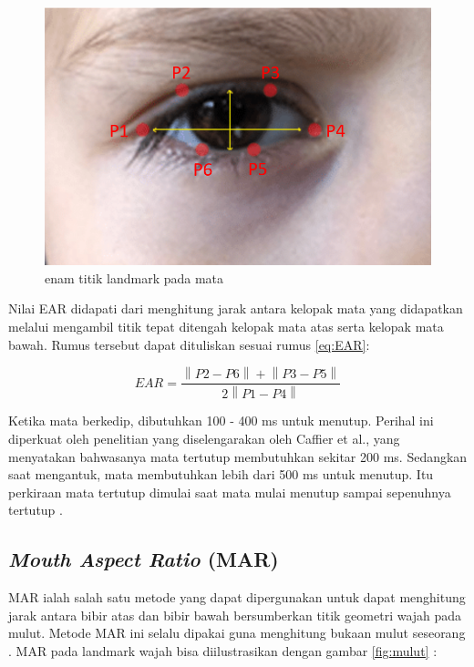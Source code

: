 \begin{figure} [ht] \centering
  \includegraphics[scale=0.35]{gambar/mata.png}
  \caption{enam titik landmark pada mata \parencite{20}}
  \label{fig:mata}
\end{figure}

Nilai EAR didapati dari menghitung jarak antara kelopak mata yang didapatkan melalui mengambil titik tepat ditengah
kelopak mata atas serta kelopak mata bawah. Rumus tersebut dapat dituliskan sesuai rumus \ref{eq:EAR}:

\begin{equation}
  \label{eq:EAR}
  EAR = \frac{\left \| P2-P6 \right \| + \left \| P3-P5 \right \|}{2 \left \| P1-P4 \right \|}
\end{equation}

Ketika mata berkedip, dibutuhkan 100 - 400 ms untuk menutup. Perihal ini diperkuat oleh penelitian yang diselengarakan
oleh Caffier et al., yang menyatakan bahwasanya mata tertutup membutuhkan sekitar 200 ms. Sedangkan saat mengantuk,
mata membutuhkan lebih dari 500 ms untuk menutup. Itu perkiraan mata tertutup dimulai saat mata mulai menutup sampai
sepenuhnya tertutup \parencite{17}.

\subsection{\emph{Mouth Aspect Ratio} (MAR)}
MAR ialah salah satu metode yang dapat dipergunakan untuk dapat menghitung jarak antara bibir atas dan bibir bawah
bersumberkan titik geometri wajah pada mulut. Metode MAR ini selalu dipakai guna menghitung bukaan mulut seseorang \parencite{12}.
MAR pada landmark wajah bisa diilustrasikan dengan gambar \ref{fig:mulut} :

